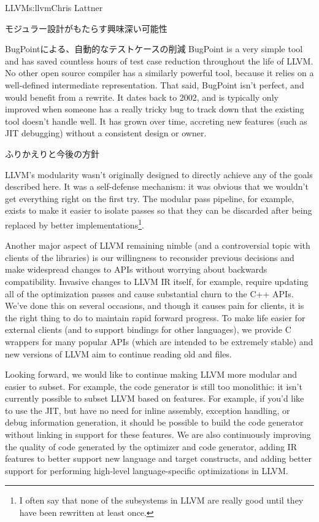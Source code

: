 \begin{aosachapter}{LLVM}{s:llvm}{Chris Lattner}
\begin{aosasect1}{モジュラー設計がもたらす興味深い可能性}
\begin{aosasect2}{BugPointによる、自動的なテストケースの削減}
BugPoint is a very simple tool and has saved countless hours of test
case reduction throughout the life of LLVM\@.  No other open source
compiler has a similarly powerful tool, because it relies on a
well-defined intermediate representation.  That said, BugPoint isn't
perfect, and would benefit from a rewrite.  It dates back to 2002, and
is typically only improved when someone has a really tricky bug to
track down that the existing tool doesn't handle well. It has grown
over time, accreting new features (such as JIT debugging) without a
consistent design or owner.

\end{aosasect2}

\end{aosasect1}

\begin{aosasect1}{ふりかえりと今後の方針}

LLVM's modularity wasn't originally designed to directly achieve any
of the goals described here. It was a self-defense mechanism: it was
obvious that we wouldn't get everything right on the first try.  The
modular pass pipeline, for example, exists to make it easier to
isolate passes so that they can be discarded after being replaced by
better implementations\footnote{I often say that none of the
subsystems in LLVM are really good until they have been rewritten at
least once.}.

Another major aspect of LLVM remaining nimble (and a controversial
topic with clients of the libraries) is our willingness to reconsider
previous decisions and make widespread changes to APIs without
worrying about backwards compatibility.  Invasive changes to LLVM IR
itself, for example, require updating all of the optimization passes
and cause substantial churn to the C++ APIs.  We've done this on
several occasions, and though it causes pain for clients, it is the
right thing to do to maintain rapid forward progress.  To make life
easier for external clients (and to support bindings for other
languages), we provide C wrappers for many popular APIs (which are
intended to be extremely stable) and new versions of LLVM aim to
continue reading old  and  files.

Looking forward, we would like to continue making LLVM more modular
and easier to subset.  For example, the code generator is still too
monolithic: it isn't currently possible to subset LLVM based on
features.  For example, if you'd like to use the JIT, but have no need
for inline assembly, exception handling, or debug information
generation, it should be possible to build the code generator without
linking in support for these features.  We are also continuously
improving the quality of code generated by the optimizer and code
generator, adding IR features to better support new language and
target constructs, and adding better support for performing high-level
language-specific optimizations in LLVM.


\end{aosasect1}
\end{aosachapter}
